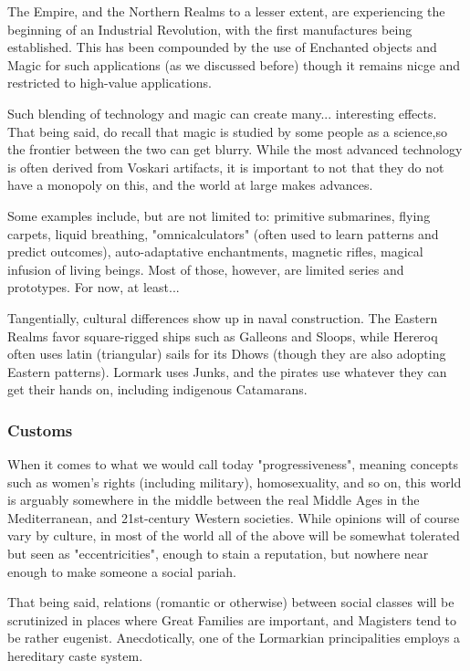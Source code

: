 The Empire, and the Northern Realms to a lesser extent, are experiencing the beginning of an Industrial Revolution, with the first manufactures being established. This has been compounded by the use of Enchanted objects and Magic for such applications (as we discussed before) though it remains nicge and restricted to high-value applications. 

Such blending of technology and magic can create many... interesting effects. That being said, do recall that magic is studied by some people as a science,so the frontier between the two can get blurry. While the most advanced technology is often derived from Voskari artifacts, it is important to not that they do not have a monopoly on this, and the world at large makes advances.

Some examples include, but are not limited to: primitive submarines, flying carpets, liquid breathing, "omnicalculators" (often used to learn patterns and predict outcomes), auto-adaptative enchantments, magnetic rifles, magical infusion of living beings. Most of those, however, are limited series and prototypes. For now, at least...

Tangentially, cultural differences show up in naval construction. The Eastern Realms favor square-rigged ships such as Galleons and Sloops, while Hereroq often uses latin (triangular) sails for its Dhows (though they are also adopting Eastern patterns). Lormark uses Junks, and the pirates use whatever they can get their hands on, including indigenous Catamarans. 

\subsubsection{Customs}

When it comes to what we would call today "progressiveness", meaning concepts such as women's rights (including military), homosexuality, and so on, this world is arguably somewhere in the middle between the real Middle Ages in the Mediterranean, and 21st-century Western societies. While opinions will of course vary by culture, in most of the world all of the above will be somewhat tolerated but seen as "eccentricities", enough to stain a reputation, but nowhere near enough to make someone a social pariah.

That being said, relations (romantic or otherwise) between social classes will be scrutinized in places where Great Families are important, and Magisters tend to be rather eugenist. Anecdotically, one of the Lormarkian principalities employs a hereditary caste system.

